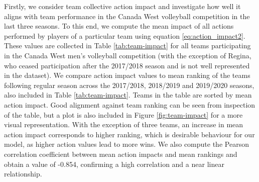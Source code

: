 \documentclass{sfuthesis}
\begin{document}
	Firstly, we consider team collective action impact and investigate how well it aligns with team performance in the Canada West volleyball competition in the last three seasons. To this end, we compute the mean impact of all actions performed by players of a particular team using equation \eqref{eq:action_impact2}. These values are collected in Table \ref{tab:team-impact} for all teams participating in the Canada West men's volleyball competition (with the exception of Regina, who ceased participation after the 2017/2018 season and is not well represented in the dataset). We compare action impact values to mean ranking of the teams following regular season across the 2017/2018, 2018/2019 and 2019/2020 seasons, also included in Table \ref{tab:team-impact}. Teams in the table are sorted by mean action impact. Good alignment against team ranking can be seen from inspection of the table, but a plot is also included in Figure \ref{fig:team-impact} for a more visual representation. With the exception of three teams, an increase in mean action impact corresponds to higher ranking, which is desirable behaviour for our model, as higher action values lead to more wins. We also compute the Pearson correlation coefficient between mean action impacts and mean rankings and obtain a value of -0.854, confirming a high correlation and a near linear relationship.
\end{document}
